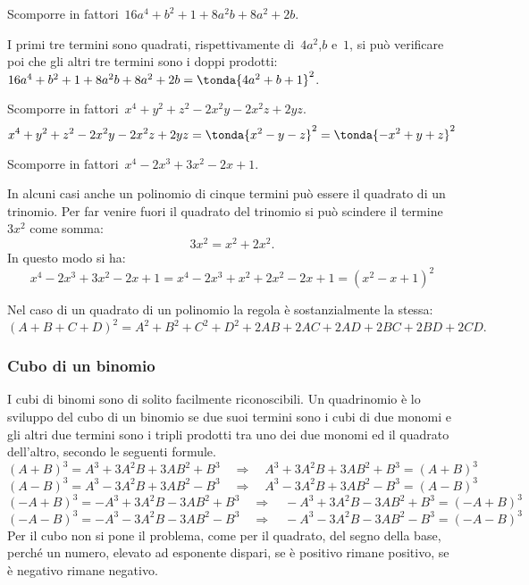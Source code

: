  \begin{esempio}
Scomporre in fattori~\(16a^{4}+b^{2}+1+8a^{2}b+8a^{2}+2b\).

I primi tre termini sono quadrati, rispettivamente di~\(4a^{2}\),\(b\) 
e~\(1\), si può verificare poi che gli altri tre termini sono i doppi 
prodotti:~\(16a^{4}+b^{2}+1+8a^{2}b+8a^{2}+2b=\tonda{4a^{2}+b+1}^{2}\).
 \end{esempio}

 \begin{esempio}
Scomporre in fattori~\(x^{4}+y^{2}+z^{2}-2x^{2}y-2x^{2}z+2yz\).
\[x^{4}+y^{2}+z^{2}-2x^{2}y-2x^{2}z+2yz=
  \tonda{x^{2}-y-z}^{2}=\tonda{-x^{2}+y+z}^{2}\]
 \end{esempio}

 \begin{esempio}
Scomporre in fattori~\(x^{4}-2x^{3}+3x^{2}-2x+1\).

In alcuni casi anche un polinomio di cinque termini può essere il quadrato di 
un trinomio.
Per far venire fuori il quadrato del trinomio si può scindere il 
termine~\(3x^{2}\) come somma:
\[3x^{2}=x^{2}+2x^{2}.\]
In questo modo si ha:
\[x^{4}-2x^{3}+3x^{2}-2x+1=x^{4}-2x^{3}+x^{2}+2x^{2}-2x+1=(x^{2}-x+1)^{2}\]
 \end{esempio}

Nel caso di un quadrato di un polinomio la regola è sostanzialmente la stessa:
\begin{equation*}
(A+B+C+D)^{2}=A^{2}+B^{2}+C^{2}+D^{2}+2AB+2AC+2AD+2BC+2BD+2CD.
\end{equation*}

\subsubsection{Cubo di un binomio}
\label{subsubsec:divpol_cubobin}

I cubi di binomi sono di solito facilmente riconoscibili. Un quadrinomio è lo 
sviluppo del cubo di un binomio se due suoi termini sono i cubi di due monomi 
e gli altri due termini sono i tripli prodotti tra uno dei due monomi ed il 
quadrato dell'altro, secondo le seguenti formule.
\[(A+B)^{3}=A^{3}+3A^{2}B+3AB^{2}+B^{3}\quad \Rightarrow \quad 
A^{3}+3A^{2}B+3AB^{2}+B^{3}=(A+B)^{3}\]
\[(A-B)^{3}=A^{3}-3A^{2}B+3AB^{2}-B^{3}\quad \Rightarrow \quad 
A^{3}-3A^{2}B+3AB^{2}-B^{3}=(A-B)^{3}\]
\[(-A+B)^{3}=-A^{3}+3A^{2}B-3AB^{2}+B^{3}\quad \Rightarrow \quad 
-A^{3}+3A^{2}B-3AB^{2}+B^{3}=(-A+B)^{3}\]
\[(-A-B)^{3}=-A^{3}-3A^{2}B-3AB^{2}-B^{3}\quad \Rightarrow \quad 
-A^{3}-3A^{2}B-3AB^{2}-B^{3}=(-A-B)^{3}\]
Per il cubo non si pone il problema, come per il quadrato, del segno della 
base, perché un numero, elevato ad esponente dispari, se è positivo rimane 
positivo, se è negativo rimane negativo.

